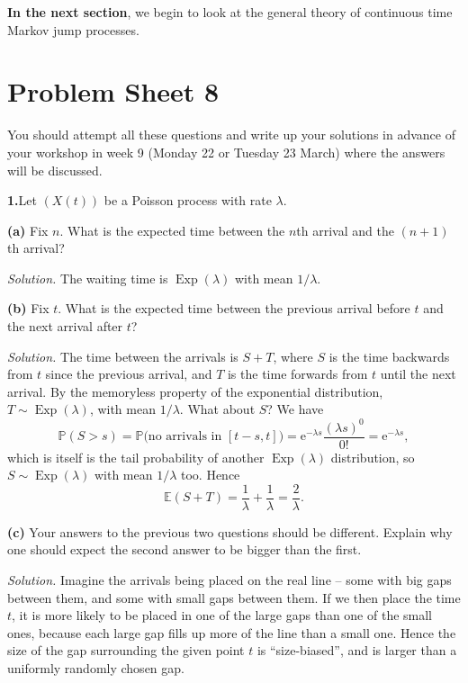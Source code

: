\documentclass[
  a4paper,
]{article}
\newif\ifcomm\commtrue
\theoremstyle{definition}
\theoremstyle{definition}
\theoremstyle{definition}
\theoremstyle{remark}
\begin{document}
\textbf{In the next section}, we begin to look at the general theory of continuous time Markov jump processes.

\hypertarget{P08}{%
\section*{Problem Sheet 8}\label{P08}}

\commtrue

You should attempt all these questions and write up your solutions in advance of your workshop in week 9 (Monday 22 or Tuesday 23 March) where the answers will be discussed.

\textbf{1.}Let \((X(t))\) be a Poisson process with rate \(\lambda\).

\textbf{(a)} Fix \(n\). What is the expected time between the \(n\)th arrival and the \((n+1)\)th arrival?

\begin{myanswers}
\emph{Solution.} The waiting time is \(\operatorname{Exp}(\lambda)\) with mean \(1/\lambda\).

\end{myanswers}

\textbf{(b)} Fix \(t\). What is the expected time between the previous arrival before \(t\) and the next arrival after \(t\)?

\begin{myanswers}
\emph{Solution.} The time between the arrivals is \(S + T\), where \(S\) is the time backwards from \(t\) since the previous arrival, and \(T\) is the time forwards from \(t\) until the next arrival. By the memoryless property of the exponential distribution, \(T \sim \operatorname{Exp}(\lambda)\), with mean \(1/\lambda\). What about \(S\)? We have
\[ \mathbb P(S > s) = \mathbb P\big(\text{no arrivals in }[t-s,t]\big) = \mathrm{e}^{-\lambda s} \frac{(\lambda s)^0}{0!} = \mathrm{e}^{-\lambda s} , \]
which is itself is the tail probability of another \(\operatorname{Exp}(\lambda)\) distribution, so \(S \sim \operatorname{Exp}(\lambda)\) with mean \(1/\lambda\) too.
Hence
\[ \mathbb E(S + T) = \frac1\lambda + \frac1\lambda = \frac2\lambda .\]

\end{myanswers}

\textbf{(c)} Your answers to the previous two questions should be different. Explain why one should expect the second answer to be bigger than the first.

\begin{myanswers}
\emph{Solution.} Imagine the arrivals being placed on the real line -- some with big gaps between them, and some with small gaps between them. If we then place the time \(t\), it is more likely to be placed in one of the large gaps than one of the small ones, because each large gap fills up more of the line than a small one. Hence the size of the gap surrounding the given point \(t\) is ``size-biased'', and is larger than a uniformly randomly chosen gap.

\end{myanswers}
\end{document}
